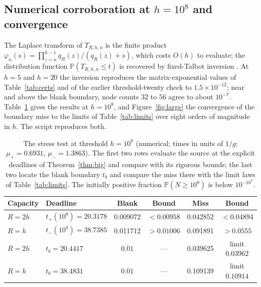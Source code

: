 \documentclass[11pt,a4paper]{article}
\theoremstyle{plain}
\theoremstyle{definition}
\theoremstyle{remark}
\newcommand{\Prob}{\mathbb P}
\newcommand{\tplus}{20.3178}
\newcommand{\tminus}{38.7385}
\newcommand{\muplus}{0.6931}
\newcommand{\muminus}{1.3863}
\newcommand{\BigBlankTwo}{0.009072}
\newcommand{\BigMissTwo}{0.042852}
\newcommand{\BigBlankOne}{0.011712}
\newcommand{\BigMissOne}{0.091891}
\newcommand{\BigTbTwo}{20.4417}
\newcommand{\BigTbOne}{38.4831}
\newcommand{\BigBoundaryTwo}{0.039625}
\newcommand{\BigBoundaryOne}{0.109139}
\begin{document}
\subsection{Numerical corroboration at \texorpdfstring{$h=10^{8}$}{h = 1e8} and convergence}\label{sec:numerics}
The Laplace transform of $T_{R,h,n}$ is the finite product $\varphi_n(s)=\prod_{z=n}^{h-1}q_R(z)/(q_R(z)+s)$, which costs $O(h)$ to evaluate; the distribution function $\Prob(T_{R,h,n}\le t)$ is recovered by fixed-Talbot inversion \citep{talbot1979,abatevalko2004,abatewhitt2006}. At $h=5$ and $h=20$ the inversion reproduces the matrix-exponential values of Table~\ref{tab:certs} and of the earlier threshold-twenty check to $1.5\times10^{-12}$; near and above the blank boundary, node counts $32$ to $56$ agree to about $10^{-7}$. Table~\ref{tab:big} gives the results at $h=10^{8}$, and Figure~\ref{fig:large} the convergence of the boundary miss to the limits of Table~\ref{tab:limits} over eight orders of magnitude in $h$. The script  reproduces both.

\begin{table}[htbp]\centering\footnotesize
\begin{tabular}{llcccc}\toprule
Capacity & Deadline & Blank & Bound & Miss & Bound\\\midrule
$R=2h$ & $t_+(10^{8})=\tplus$ & \BigBlankTwo & $<0.00958$ & \BigMissTwo & $<0.04894$\\
$R=h$ & $t_-(10^{8})=\tminus$ & \BigBlankOne & $>0.01006$ & \BigMissOne & $>0.0555$\\
\midrule
$R=2h$ & $t_b=\BigTbTwo$ & $0.01$ & --- & \BigBoundaryTwo & limit $0.03962$\\
$R=h$ & $t_b=\BigTbOne$ & $0.01$ & --- & \BigBoundaryOne & limit $0.10914$\\\bottomrule
\end{tabular}
\caption{The stress test at threshold $h=10^{8}$ (numerical; times in units of $1/g$; $\mu_+=\muplus$, $\mu_-=\muminus$). The first two rows evaluate the source at the explicit deadlines of Theorem~\ref{thm:big} and compare with its rigorous bounds; the last two locate the blank boundary $t_b$ and compare the miss there with the limit laws of Table~\ref{tab:limits}. The initially positive fraction $\Prob(N\ge10^{8})$ is below $10^{-10^{7}}$.}
\label{tab:big}
\end{table}
\end{document}
